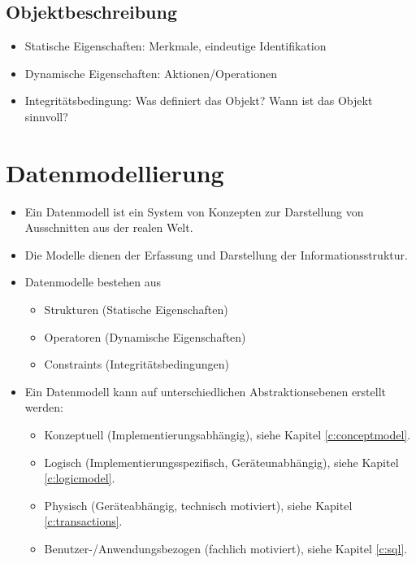         \subsection{Objektbeschreibung} %
            \begin{itemize}
            	\item Statische Eigenschaften: Merkmale, eindeutige Identifikation
            	\item Dynamische Eigenschaften: Aktionen/Operationen
            	\item Integritätsbedingung: Was definiert das Objekt? Wann ist das Objekt sinnvoll?
            \end{itemize}

    \section{Datenmodellierung} %
        \begin{itemize}
        	\item Ein Datenmodell ist ein System von Konzepten zur Darstellung von Ausschnitten aus der realen Welt.
        	\item Die Modelle dienen der Erfassung und Darstellung der Informationsstruktur.
        	\item Datenmodelle bestehen aus
        		\begin{itemize}
        			\item Strukturen (Statische Eigenschaften)
        			\item Operatoren (Dynamische Eigenschaften)
        			\item Constraints (Integritätsbedingungen)
        		\end{itemize}
        	\item Ein Datenmodell kann auf unterschiedlichen Abstraktionsebenen erstellt werden:
        		\begin{itemize}
        			\item Konzeptuell (Implementierungsabhängig), siehe Kapitel \ref{c:conceptmodel}.
        			\item Logisch (Implementierungsspezifisch, Geräteunabhängig), siehe Kapitel \ref{c:logicmodel}.
        			\item Physisch (Geräteabhängig, technisch motiviert), siehe Kapitel \ref{c:transactions}.
        			\item Benutzer-/Anwendungsbezogen (fachlich motiviert), siehe Kapitel \ref{c:sql}.
        		\end{itemize}
        \end{itemize}

